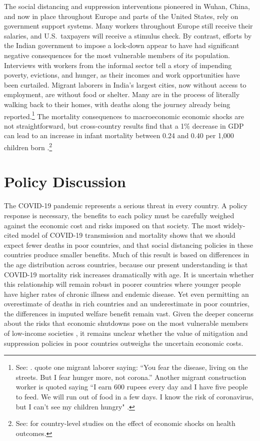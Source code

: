 \documentclass[11pt]{article}
\begin{document}
The social distancing and suppression interventions pioneered in Wuhan, China, and now in place throughout Europe and parts of the United States, rely on government support systems. Many workers throughout Europe still receive their salaries, and U.S.\ taxpayers will receive a stimulus check. By contrast, efforts by the Indian government to impose a lock-down appear to have had significant negative consequences for the most vulnerable members of its population. Interviews with workers from the informal sector tell a story of impending poverty, evictions, and hunger, as their incomes and work opportunities have been curtailed. Migrant laborers in India's largest cities, now without access to employment, are without food or shelter. Many are in the process of literally walking back to their homes, with deaths along the journey already being reported.\footnote{
  See: \textcite{abihabib2020b,abihabib2020a,bbc2020,tewari2020}. \textcite{abihabib2020a} quote one migrant laborer saying: ``You fear the disease, living on the streets. But I fear hunger more, not corona.'' Another migrant construction worker is quoted saying ``I earn 600 rupees every day and I have five people to feed. We will run out of food in a few days. I know the risk of coronavirus, but I can't see my children hungry" \parencite{bbc2020}.}
The mortality consequences to macroeconomic economic shocks are not straightforward, but cross-country results find that a 1\% decrease in GDP can lead to an increase in infant mortality between 0.24 and 0.40 per 1,000 children born \parencite{baird2011}.\footnote{
	See: \textcite{paxson2005,cutler2002,bhalotra2010} for country-level studies on the effect of economic shocks on health outcomes.}


\section{Policy Discussion}

The COVID-19 pandemic represents a serious threat in every country. A policy response is necessary, the benefits to each policy must be carefully weighed against the economic cost and risks imposed on that society. The most widely-cited model of COVID-19 transmission and mortality shows that we should expect fewer deaths in poor countries, and that social distancing policies in these countries produce smaller benefits. Much of this result is based on differences in the age distribution across countries, because our present understanding is that COVID-19 mortality risk increases dramatically with age. It is uncertain whether this relationship will remain robust in poorer countries where younger people have higher rates of chronic illness and endemic disease. Yet even permitting an overestimate of deaths in rich countries and an underestimate in poor countries, the differences in imputed welfare benefit remain vast. Given the deeper concerns about the risks that economic shutdowns pose on the most vulnerable members of low-income societies \parencite{saleh2020}, it remains unclear whether the value of mitigation and suppression policies in poor countries outweighs the uncertain economic costs. 
\end{document}
